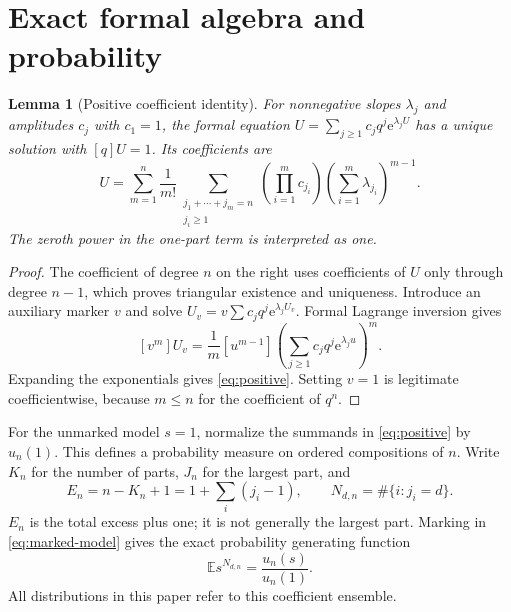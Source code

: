 \documentclass[11pt,a4paper]{article}
\numberwithin{equation}{section}
\newtheorem{lemma}[theorem]{Lemma}
\theoremstyle{definition}
\theoremstyle{remark}
\newcommand{\ee}{\mathrm e}\newcommand{\dd}{\mathrm d}
\newcommand{\E}{\mathbb E}\newcommand{\Prob}{\mathbb P}
\begin{document}
\section{Exact formal algebra and probability}
\label{sec:formal}
\begin{lemma}[Positive coefficient identity]
\label{lem:positive}
For nonnegative slopes $\lambda_j$ and amplitudes $c_j$ with $c_1=1$, the
formal equation
$U=\sum_{j\ge1}c_jq^j\ee^{\lambda_jU}$ has a unique solution with
$[q]U=1$. Its coefficients are
\begin{equation}
 [q^n]U=
 \sum_{m=1}^{n}\frac1{m!}
 \sum_{\substack{j_1+\cdots+j_m=n\\j_i\ge1}}
 \left(\prod_{i=1}^{m}c_{j_i}\right)
 \left(\sum_{i=1}^{m}\lambda_{j_i}\right)^{m-1}.
 \label{eq:positive}
\end{equation}
The zeroth power in the one-part term is interpreted as one.
\end{lemma}
\begin{proof}
The coefficient of degree $n$ on the right uses coefficients of $U$ only
through degree $n-1$, which proves triangular existence and uniqueness.
Introduce an auxiliary marker $v$ and solve
$U_v=v\sum c_jq^j\ee^{\lambda_jU_v}$. Formal Lagrange inversion gives
\[
 [v^m]U_v=\frac1m[u^{m-1}]
       \left(\sum_{j\ge1}c_jq^j\ee^{\lambda_j u}\right)^m.
\]
Expanding the exponentials gives \eqref{eq:positive}. Setting $v=1$ is
legitimate coefficientwise, because $m\le n$ for the coefficient of $q^n$.
\end{proof}

For the unmarked model $s=1$, normalize the summands in
\eqref{eq:positive} by $u_n(1)$. This defines a probability measure on
ordered compositions of $n$. Write $K_n$ for the number of parts,
$J_n$ for the largest part, and
\begin{equation}
 E_n=n-K_n+1=1+\sum_i(j_i-1),\qquad
 N_{d,n}=\#\{i:j_i=d\}.
 \label{eq:counts}
\end{equation}
$E_n$ is the total excess plus one; it is not generally the largest part.
Marking in \eqref{eq:marked-model} gives the exact probability generating
function
\begin{equation}
 \E s^{N_{d,n}}=\frac{u_n(s)}{u_n(1)}.
 \label{eq:pgf}
\end{equation}
All distributions in this paper refer to this coefficient ensemble.
\end{document}

